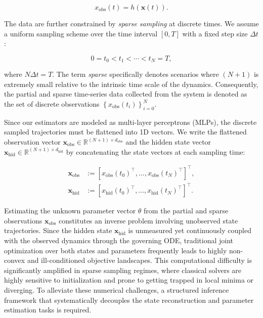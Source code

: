 \begin{equation}
\label{eq:h-projection}
    x_{\mathrm{obs}}(t)=h(\mathbf{x}(t)).
\end{equation}



The data are further constrained by \emph{sparse sampling} at discrete times.
We assume a uniform sampling scheme over the time interval $[0, T]$ with a fixed step size $\Delta t$:

\begin{equation}
\label{eq:sampling-times}
    0=t_0<t_1<\cdots<t_{N}=T,
\end{equation}

where $N\Delta t = T$.
The term \emph{sparse} specifically denotes scenarios where $(N+1)$ is extremely small relative to the intrinsic time scale of the dynamics.
Consequently, the partial and sparse time-series data collected from the system is denoted as the set of discrete observations $\left\{x_\mathrm{obs}(t_i)\right\}_{i=0}^{N}$.

Since our estimators are modeled as multi-layer perceptrons (MLPs), the discrete sampled trajectories must be flattened into 1D vectors.
We write the flattened observation vector $\mathbf{x}_\mathrm{obs} \in \mathbb{R}^{(N+1)
\times d_\mathrm{obs}}$ and the hidden state vector $\mathbf{x}_\mathrm{hid} \in \mathbb{R}^{(N+1) \times d_\mathrm{hid}}$ by concatenating the state vectors at each sampling time:

\begin{align}
    \mathbf{x}_{\mathrm{obs}}&
    :=[x_{\mathrm{obs}}(t_0)^\top,\ldots,x_{\mathrm{obs}}(t_{N})^\top]^\top
,
\\
    \mathbf{x}_{\mathrm{hid}}&
    :=[x_{\mathrm{hid}}(t_0)^\top,\ldots,x_{\mathrm{hid}}(t_{N})^\top]^\top.
\end{align}

Estimating the unknown parameter vector $\theta$ from the partial and sparse observations $\mathbf{x}_\mathrm{obs}$ constitutes an inverse problem involving unobserved state trajectories. 
Since the hidden state $\mathbf{x}_\mathrm{hid}$ is unmeasured yet continuously coupled with the observed dynamics through the governing ODE, traditional joint optimization over both states and parameters frequently leads to highly non-convex and ill-conditioned objective landscapes. 
This computational difficulty is significantly amplified in sparse sampling regimes, where classical solvers are highly sensitive to initialization and prone to getting trapped in local minima or diverging. 
To alleviate these numerical challenges, a structured inference framework that systematically decouples the state reconstruction and parameter estimation tasks is required.

